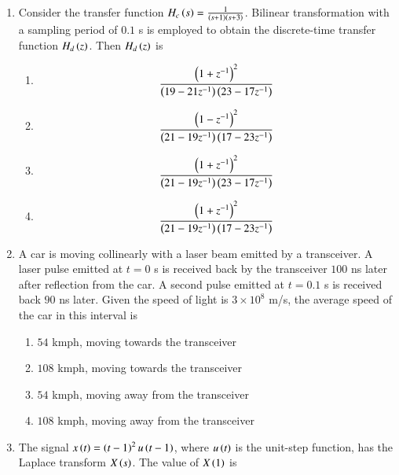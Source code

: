 \documentclass[journal,12pt,onecolumn]{IEEEtran}
\theoremstyle{remark}
\begin{document}
\begin{enumerate}
\item Consider the transfer function $H_c\left(s\right) = \frac{1}{\left(s+1\right)\left(s+3\right)}$. Bilinear transformation with a sampling period of $0.1$ s is employed to obtain the discrete-time transfer function $H_d\left(z\right)$. Then $H_d\left(z\right)$ is \underline{\hspace{2cm}}

\hfill{}
\begin{enumerate}
\item \begin{align*}\frac{\left(1 + z^{-1}\right)^2}{\left(19 - 21z^{-1}\right)\left(23 - 17z^{-1}\right)}\end{align*}
\item \begin{align*}\frac{\left(1 - z^{-1}\right)^2}{\left(21 - 19z^{-1}\right)\left(17 - 23z^{-1}\right)}\end{align*}
\item \begin{align*}\frac{\left(1 + z^{-1}\right)^2}{\left(21 - 19z^{-1}\right)\left(23 - 17z^{-1}\right)}\end{align*}
\item \begin{align*}\frac{\left(1 + z^{-1}\right)^2}{\left(21 - 19z^{-1}\right)\left(17 - 23z^{-1}\right)}\end{align*}
\end{enumerate}

\item A car is moving collinearly with a laser beam emitted by a transceiver. A laser pulse emitted at $t = 0$ s is received back by the transceiver $100$ ns  later after reflection from the car. A second pulse emitted at $t = 0.1$ s is received back $90$ ns later. Given the speed of light is $3 \times 10^8$ m/s, the average speed of the car in this interval is \underline{\hspace{2cm}}

\hfill{}
\begin{enumerate}
\item $54$ kmph, moving towards the transceiver
\item $108$ kmph, moving towards the transceiver
\item $54$ kmph, moving away from the transceiver
\item $108$ kmph, moving away from the transceiver
\end{enumerate}

\item The signal $x\left(t\right) = \left(t - 1\right)^2 u\left(t - 1\right)$, where $u\left(t\right)$ is the unit-step function, has the Laplace transform $X\left(s\right)$. The value of $X\left(1\right)$ is \underline{\hspace{2cm}}


\end{enumerate}
\end{document}
